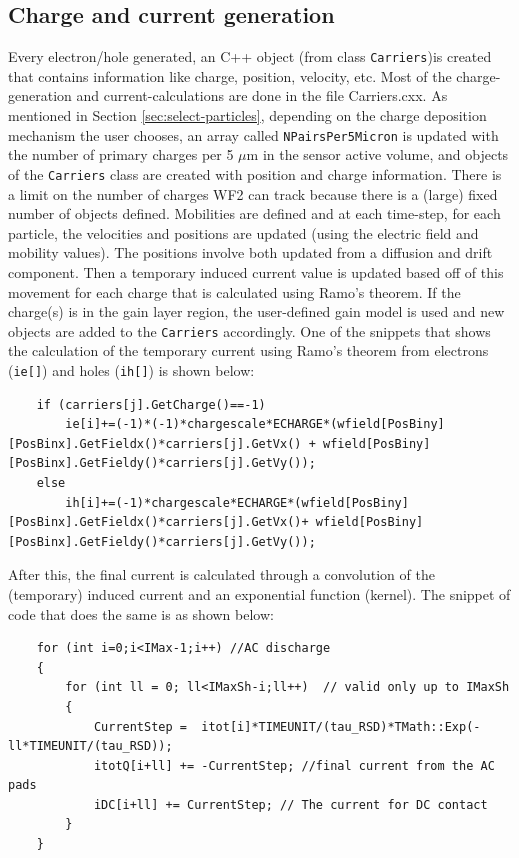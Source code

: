 \documentclass[11pt]{article}
\begin{document}
\subsection{Charge and current generation}
Every electron/hole generated, an C++ object (from class \texttt{Carriers})is created that contains information like charge, position, velocity, etc. Most of the charge-generation and current-calculations are done in the file Carriers.cxx. As mentioned in Section \ref{sec:select-particles}, depending on the charge deposition mechanism the user chooses, an array called \texttt{NPairsPer5Micron} is updated with the number of primary charges per 5 $\mu$m in the sensor active volume, and objects of the \texttt{Carriers} class are created with position and charge information. There is a limit on the number of charges WF2 can track because there is a (large) fixed number of objects defined. 
\newline Mobilities are defined and at each time-step, for each particle, the velocities and positions are updated (using the electric field and mobility values). The positions involve both updated from a diffusion and drift component. Then a temporary induced current value is updated based off of this movement for each charge that is calculated using Ramo's theorem. If the charge(s) is in the gain layer region, the user-defined gain model is used and new objects are added to the \texttt{Carriers} accordingly. One of the snippets that shows the calculation of the temporary current using Ramo's theorem from electrons (\texttt{ie[]}) and holes (\texttt{ih[]}) is shown below:
\begin{lstlisting}
    if (carriers[j].GetCharge()==-1)
        ie[i]+=(-1)*(-1)*chargescale*ECHARGE*(wfield[PosBiny][PosBinx].GetFieldx()*carriers[j].GetVx() + wfield[PosBiny][PosBinx].GetFieldy()*carriers[j].GetVy());   
	else
		ih[i]+=(-1)*chargescale*ECHARGE*(wfield[PosBiny][PosBinx].GetFieldx()*carriers[j].GetVx()+ wfield[PosBiny][PosBinx].GetFieldy()*carriers[j].GetVy());
\end{lstlisting}
After this, the final current is calculated through a convolution of the (temporary) induced current and an exponential function (kernel). The snippet of code that does the same is as shown below:
\begin{lstlisting}
    for (int i=0;i<IMax-1;i++) //AC discharge
	{
	    for (int ll = 0; ll<IMaxSh-i;ll++)  // valid only up to IMaxSh 
	    {
		    CurrentStep =  itot[i]*TIMEUNIT/(tau_RSD)*TMath::Exp(-ll*TIMEUNIT/(tau_RSD));
		    itotQ[i+ll] += -CurrentStep; //final current from the AC pads
		    iDC[i+ll] += CurrentStep; // The current for DC contact
	    }
	}
\end{lstlisting}
\end{document}
